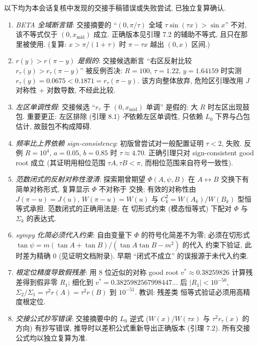 \documentclass[UTF8]{ctexart}
\begin{document}
以下均为本会话复核中发现的交接手稿错误或失败尝试, 已独立复算确认.

\begin{enumerate}
	\item \emph{BETA 全域断言错}: 交接摘要的 ``$(0,\pi/\tau)$ 全域
		$\tau\sin(\tau x)>\sin x$'' 不对, 该不等式仅于 $(0,x_{\mathrm{mid}})$
		成立. 正确版本见引理 7.2 的辅助不等式, 且只在那里被使用. (复算:
		$x>\pi/(1+\tau)$ 时 $\pi-\tau x$ 越出 $(0,x)$ 区间.)
	\item \emph{$r(y)>r(\pi-y)$ 是假的}: 交接候选断言 ``右区反射比较
		$r_\tau(y)>r_\tau(\pi-y)$'' 被反例否决: $R=100$, $\tau=1.22$,
		$y=1.64159$ 时实测 $r_\tau(y)=0.0675<0.1871=r_\tau(\pi-y)$.
		该方向整体放弃, 危险区引理改用 $J$ 对称性 + 对数导数, 不经此比较.
	\item \emph{左区单调性假}: 交接候选 ``$r_\tau$ 于 $(0,x_{\mathrm{mid}})$
		单调'' 是假的: 大 $R$ 时左区出现鼓包. 重要更正: 左区排除 (引理 8.1)
		\emph{不}依赖左区单调性, 只依赖 $L_0$ 下界与凸包估计, 故鼓包不构成障碍.
	\item \emph{频率比上界依赖 sign-consistency}: 初版曾尝试对一般配置证明
		$\tau<2$, 失败. 反例 $R=10^4$, $a=0.05$, $b=0.85$ 时 $\tau\approx4.70$.
		正确引理只对 sign-consistent good root 成立 (其证明用相位范围
		$\tau A,\tau B<\pi$, 而相位范围来自符号一致性).
	\item \emph{范数闭式的反射对称性澄清}: 探索期曾期望 $\Phi(A,\psi,B)$ 在
		$A\leftrightarrow B$ 交换下有简单对称形式, 复算显示 $\Phi$ 不对称于
		交换; 有效的对称性由 $J(\pi-u)=J(u)$, $W(\pi-u)=W(u)$ 与
		$C_k^2=W(A_k)/W(B_k)$ 型恒等式承担. 范数闭式的正确用法是: 在
		切形式约束 (模态恒等式) 下配对 $\Phi$ 与 $\Sigma_k$ 的表达式.
	\item \emph{sympy 化简必须代入约束}: 自由变量下 $\Phi$ 的符号化简差不为零;
		必须在切形式 $\tan\psi=m(\tan A+\tan B)/(\tan A\tan B-m^2)$ 的代入
		约束下验证, 此时差为精确 $0$ (见证明文档附录). 早期 ``闭式不成立''
		的误报源于未代入约束.
	\item \emph{根定位精度导致假残差}: 用 8 位近似的对称 good root
		$v^*\approx0.38259826$ 计算残差得到假非零 $R_1$; 细化到
		$v^*=0.3825982567998447\ldots$ 后 $|R_1|<10^{-50}$,
		$\Sigma_2/\Sigma_1=\tau^2r(A)=\tau^2r(B)$ 到 $10^{-51}$. 教训: 残差类
		恒等式验证必须用高精度根定位.
	\item \emph{交接公式抄写错误}: 交接摘要中的 $L_0$ 逆式 ($W(x)/W(\tau x)$ 与
		$\tau^2r_\tau(x)$ 的方向) 有抄写错误, 推导时以差积公式重新导出正确版本
		(引理 7.2). 所有交接公式均以独立复算为准.
\end{enumerate}
\end{document}
